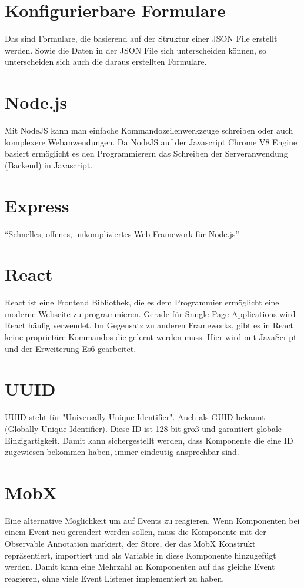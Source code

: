 \documentclass[a4paper,11pt]{scrreprt}
\begin{document}
\section{Konfigurierbare Formulare}
Das sind Formulare, die basierend auf der Struktur einer JSON File erstellt werden. Sowie die Daten in der JSON File sich unterscheiden können, so unterscheiden sich auch die daraus erstellten Formulare.


\section{Node.js}
Mit NodeJS kann man einfache Kommandozeilenwerkzeuge schreiben oder auch
komplexere Webanwendungen. Da NodeJS auf der Javascript Chrome V8 Engine basiert
ermöglicht es den Programmierern das Schreiben der Serveranwendung (Backend) in
Javascript. \cite{Weiss2019}

\section{Express}
“Schnelles, offenes, unkompliziertes Web-Framework für Node.js” \cite{None2019}

\section{React}
React ist eine Frontend Bibliothek, die es dem Programmier ermöglicht eine moderne Webseite zu programmieren. 
Gerade für Snngle Page Applications wird React häufig verwendet. Im Gegensatz zu anderen Frameworks, gibt es in React keine proprietäre Kommandos die gelernt werden muss. Hier wird mit JavaScript und der Erweiterung Es6 gearbeitet. 


\section{UUID}
UUID steht für "Universally Unique Identifier". Auch als GUID bekannt (Globally Unique Identifier). Diese ID ist 128 bit groß und garantiert globale Einzigartigkeit. \cite{rfc4122} Damit kann sichergestellt werden, dass Komponente die eine ID zugewiesen bekommen haben, immer eindeutig ansprechbar sind.

\section{MobX}
Eine alternative Möglichkeit um auf Events zu reagieren. 
Wenn Komponenten bei einem Event neu gerendert werden sollen, muss die Komponente mit der Observable Annotation markiert, der Store, der das MobX Konstrukt repräsentiert, importiert und als Variable in diese Komponente hinzugefügt werden. 
Damit kann eine Mehrzahl an Komponenten auf das gleiche Event reagieren, ohne viele Event Listener implementiert zu haben.
\end{document}
